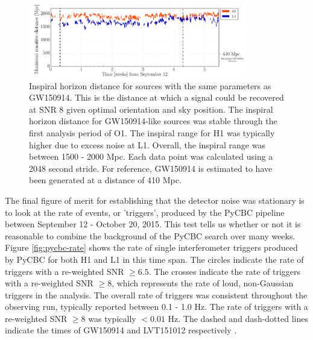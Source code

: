 \begin{figure}[ht!]%
\includegraphics[width=0.85\textwidth]{figures/O1/inspiral-range}
\caption[Inspiral horizon distance in O1]{Inspiral horizon distance for sources with %
         the same parameters as GW150914. This is the distance at %
         which a signal could be recovered at SNR 8 given optimal %
         orientation and sky position. The inspiral horizon distance for %
         GW150914-like sources was stable through the first analysis %
         period of O1. The inspiral %
         range for H1 was typically higher due to excess noise %
         at L1. Overall, the inspiral range was between 1500 - 2000 Mpc. %
         Each data point was calculated using a 2048 second stride. %
         For reference, GW150914 is estimated to have been generated at a %
         distance of 410 Mpc. %
         }
\label{fig:inspiral-range}
\end{figure}

The final figure of merit for establishing that the detector noise was
stationary is to look at the rate of events, or 'triggers', produced by the PyCBC pipeline
between September 12 - October 20, 2015. This test tells us whether or not it
is reasonable to combine the background of the PyCBC search over many weeks.
Figure \ref{fig:pycbc-rate} shows
the rate of single
interferometer triggers produced by PyCBC for both H1 and L1 in this time
span. The circles indicate the rate of triggers with a re-weighted SNR
$\geq 6.5$. The crosses indicate the rate of triggers with a re-weighted SNR
$\geq 8$, which represents the rate of loud, non-Gaussian triggers in the
analysis. The overall rate of triggers was consistent throughout the
observing run, typically reported between 0.1 - 1.0 Hz. The rate of triggers
with a re-weighted SNR $\geq 8$ was typically $< 0.01$ Hz. The dashed
and dash-dotted lines indicate the times of GW150914 and LVT151012 respectively
\cite{GW150914-DETCHAR}.

